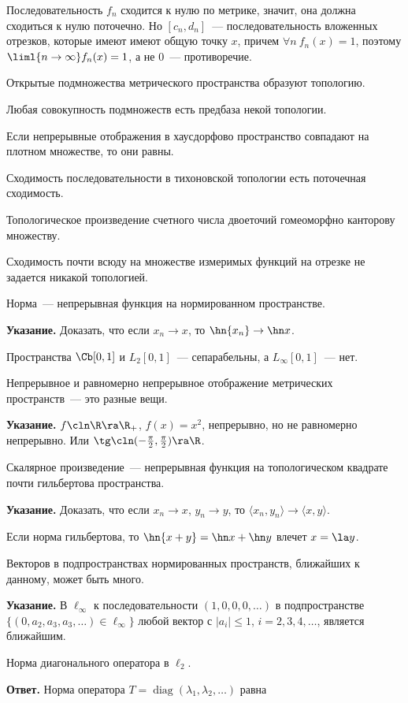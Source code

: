 \documentclass[a4paper]{article}
\def\apoint{\par\textbf{Указание.} }
\def\answer{\par\textbf{Ответ.} }
\begin{document}
\begin{nums}{-1}
\begin{solution}
Последовательность $f_n$ сходится к нулю по метрике, значит, она должна сходиться к нулю поточечно.
Но $[c_n,d_n]$~--- последовательность вложенных отрезков, которые имеют имеют общую точку $x$,
причем $\forall n\>f_n(x)=1$, поэтому $\liml{n\rightarrow\infty} f_n(x)=1$, а не $0$~---
противоречие.
\end{solution}

\item Открытые подмножества метрического пространства образуют топологию.
\item Любая совокупность подмножеств есть предбаза некой топологии.
\item Если непрерывные отображения в хаусдорфово пространство совпадают на плотном множестве, то они равны.
\item Сходимость последовательности в тихоновской топологии есть поточечная сходимость.
\item Топологическое произведение счетного числа двоеточий гомеоморфно  канторову множеству.
\item Сходимость почти всюду на множестве измеримых функций на отрезке не задается никакой топологией.
\item Норма~--- непрерывная функция на нормированном пространстве.
\apoint Доказать, что если $x_n\rightarrow x$, то $\hn{x_n}\rightarrow \hn x$.
\item Пространства $\Cb[0,1]$ и $L_2[0,1]$~--- сепарабельны, а $L_\infty[0,1]$~--- нет.
\item Непрерывное и равномерно непрерывное отображение метрических пространств~--- это разные вещи.
\apoint $f\cln\R\ra\R_+$, $f(x)=x^2$, непрерывно, но не равномерно непрерывно. Или
$\tg\cln(-\frac\pi2,\frac\pi2)\ra \R$.
\item Скалярное произведение~--- непрерывная функция на топологическом квадрате почти гильбертова пространства.
\apoint Доказать, что если $x_n\rightarrow x$, $y_n\rightarrow y$, то $\langle
x_n,y_n\rangle\rightarrow\langle x,y\rangle$.
\item Если норма гильбертова, то $\hn{x+y}=\hn x +\hn y$ влечет $x = \la y$.
\item Векторов в подпространствах нормированных пространств, ближайших к данному, может быть много.
\apoint В $\ell_\infty$ к последовательности $(1,0,0,0,\dots)$ в подпространстве
$\{(0,a_2,a_3,a_3,\dots)\in \ell_\infty\}$ любой вектор с $|a_i|\leqslant1$, $i=2,3,4,\dots$,
является ближайшим.
\item Норма диагонального оператора в $\ell_2$.
\answer Норма оператора $T=\mathop{\mathrm{diag}}(\lambda_1,\lambda_2,\dots)$ равна

\end{nums}
\end{document}
